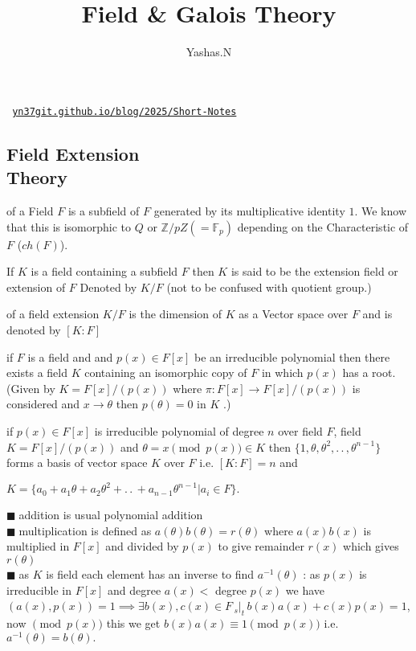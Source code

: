 \documentclass[11pt]{extarticle}
\author{Yashas.N}
\title{Field \& Galois Theory}
\date{}
\newcommand{\Z}{\mathbb{Z}}
\newcommand{\ra}{\rightarrow}
\newcommand{\ck}{.\,.\,}
\newcommand{\snote}[1]{{\footnotesize(#1)}}
\newcommand{\st}{\,{}_{s}|_t\,}
\newcommand{\tbx}[2][]{
\begin{tcolorbox}[enhanced,breakable,size=small,colback=black!2!white,title={#1},arc is angular, arc=1.5mm,drop fuzzy shadow]
	#2
\end{tcolorbox}
}
\newcommand{\y}{$\blacksquare\;$}
\begin{document}
	\maketitle
	\begin{center}\texttt{
			\href{https://yn37git.github.io/blog/2025/Short-Notes/}{yn37git.github.io/blog/2025/Short-Notes}}
	\end{center} 
	
	\boldmath
	\begin{multicols}{2}
	\tableofcontents
	
	\section{Field Extension \\ Theory}
\tbx[\textbf{Prime Subfield}]{of a Field $ F $ is a subfield of $ F $ generated by its multiplicative identity $ 1 $. We know that this is isomorphic to $ Q $ or $ \Z/pZ(=\mathbb{ F }_p) $ depending on the Characteristic of 
		$ F $ ($ch(F)$).
		} 
\tbx{If $ K $ is a field containing a subfield $ F $ then $ K $ is said to be the extension field or extension of $ F $ Denoted by $ K/F $ \snote{not to be confused with quotient group.}
		} 
\tbx[\textbf{Degree or Index} ]{of a field extension $ K/F $ is the dimension of $ K $ as a Vector space over $ F $ and is denoted by $ [K:F] $ 
		} 
\tbx[\textbf{Existence of Extension} : ]{ if $F$ is a field and and $ p(x) \in F[x]$ be an irreducible polynomial then
		there exists a field $K $ containing an isomorphic copy of $F$ in which $p(x)$ has a root. \\
		\snote{Given by $ K=F[x]/(p(x)) $ where $ \pi : F[x]\ra F[x]/(p(x)) $ is considered and $ x\ra \theta $ then $ p(\theta)=0 $ in $  K $ .}
		} 
\tbx{if $ p(x)\in F[x] $ is irreducible polynomial of degree $ n $ over field $ F $, field $ K= F[x]/(p(x)) $ and $ \theta = x\pmod{p(x)} \in K$ then $ \{1,\theta,	\theta^2,\ck , \theta^{n-1}\} $ forms a basis of vector space $ K $ over $ F $ i.e. $ [K:F]=n $ and 
		\begin{center}
			$ K=\{a_0+a_1\theta+a_2\theta^2+\ck +a_{n-1}\theta^{n-1}| a_i \in F\} .$
		\end{center}  
		} 
\tbx[Operations in field extension via $ p(x) $]{
\y addition is usual polynomial addition\\
\y  multiplication is defined as $ a(\theta)b(\theta)=r(\theta) $ where $ a(x)b(x) $ is multiplied in $ F[x] $ and divided by $ p(x) $ to give remainder $ r(x) $ which gives $ r(\theta) $ \\
\y as $ K $ is field each element has an inverse to find $ a^{-1}(\theta) $ : as $ p(x) $ is irreducible in $ F[x] $ and degree $ a(x)< $ degree $ p(x) $ we have $ (a(x),p(x))=1 \implies \exists b(x),c(x)\in F \st b(x)a(x)+c(x)p(x)=1$, now $ \pmod{p(x)} $ this we get $ b(x)a(x) \equiv 1\pmod{p(x)}$ i.e. 
		$ a^{-1}(\theta)=b(\theta) .$}
		

\end{multicols}
\end{document}
